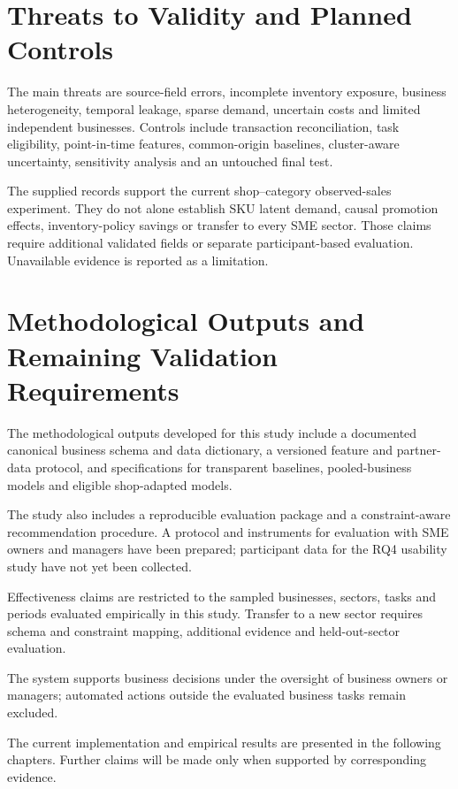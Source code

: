 \documentclass[a4paper,11pt,oneside]{book}
\theoremstyle{plain}
\theoremstyle{definition}
\theoremstyle{remark}
\begin{document}
\section{Threats to Validity and Planned Controls}
The main threats are source-field errors, incomplete inventory exposure,
business heterogeneity, temporal leakage, sparse demand, uncertain costs and
limited independent businesses. Controls include transaction reconciliation,
task eligibility, point-in-time features, common-origin baselines,
cluster-aware uncertainty, sensitivity analysis and an untouched final test.

The supplied records support the current shop--category observed-sales
experiment. They do not alone establish SKU latent demand, causal promotion
effects, inventory-policy savings or transfer to every SME sector. Those
claims require additional validated fields or separate participant-based
evaluation. Unavailable evidence is reported as a limitation.

\section{Methodological Outputs and Remaining Validation Requirements}
\label{sec:expected_methodological_outputs}

The methodological outputs developed for this study include a documented
canonical business schema and data dictionary, a versioned feature and
partner-data protocol, and specifications for transparent baselines,
pooled-business models and eligible shop-adapted models.

The study also includes a reproducible evaluation package and a
constraint-aware recommendation procedure. A protocol and instruments for
evaluation with SME owners and managers have been prepared; participant data
for the RQ4 usability study have not yet been collected.

Effectiveness claims are restricted to the sampled businesses, sectors,
tasks and periods evaluated empirically in this study. Transfer to a new
sector requires schema and constraint mapping, additional evidence and
held-out-sector evaluation.

The system supports business decisions under the oversight of business
owners or managers; automated actions outside the evaluated business tasks
remain excluded.

The current implementation and empirical results are presented in the
following chapters. Further claims will be made only when supported by
corresponding evidence.
\end{document}
